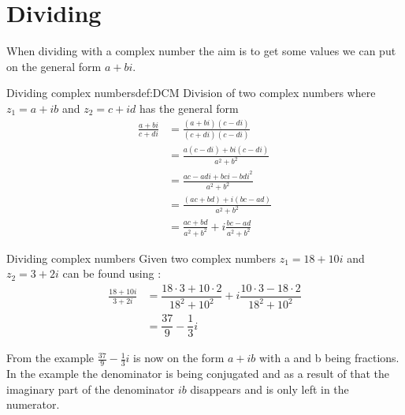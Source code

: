 \section{Dividing}
When dividing with a complex number the aim is to get some values we can put on the general form $a + bi$. 
\begin{definition}{Dividing complex numbers}{def:DCM}
Division of two complex numbers where $z_1=a+ib$ and $z_2=c+id$ has the general form
\begin{align*}
\frac{a + bi}{c + di} 										
&= \frac{(a+bi)(c-di)}{(c+di)(c-di)} 						\\[1em]
&= \frac{a(c-di)+bi(c-di)}{a^2+b^2} 							\\[1em]
&= \frac{ac-adi+bci-bdi^2}{a^2+b^2}							\\[1em]
&= \frac{(ac+bd)+i(bc-ad)}{a^2+b^2}							\\[1em]
&= \frac{ac+bd}{a^2+b^2}+i \frac{bc-ad}{a^2+b^2}				
\end{align*}
\end{definition}
\begin{example}{Dividing complex numbers}{}
Given two complex numbers $z_1=18+10i$ and $z_2=3+2i$ can be found using :
\begin{align*}
\frac{18 + 10i}{3 + 2i} &= \dfrac{18\cdot3+10\cdot2}{18^2+10^2}+i\dfrac{10\cdot3-18\cdot2}{18^2+10^2}
\\
&=\dfrac{37}{9}-\dfrac{1}{3}i
\end{align*}
\end{example}
From the example $\frac{37}{9} - \frac{1}{3}i$ is now on the form $a+ib$ with a and b being fractions. In the example the denominator is being conjugated and as a result of that the imaginary part of the denominator $ib$ disappears and is only left in the numerator. 
